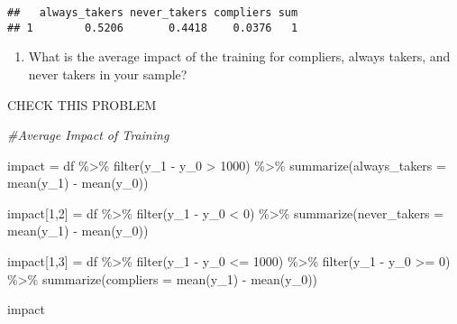 \documentclass[
]{article}
\newenvironment{Shaded}{\begin{snugshade}}{\end{snugshade}}
\newcommand{\AttributeTok}[1]{\textcolor[rgb]{0.77,0.63,0.00}{#1}}
\newcommand{\CommentTok}[1]{\textcolor[rgb]{0.56,0.35,0.01}{\textit{#1}}}
\newcommand{\DecValTok}[1]{\textcolor[rgb]{0.00,0.00,0.81}{#1}}
\newcommand{\FunctionTok}[1]{\textcolor[rgb]{0.00,0.00,0.00}{#1}}
\newcommand{\NormalTok}[1]{#1}
\newcommand{\OtherTok}[1]{\textcolor[rgb]{0.56,0.35,0.01}{#1}}
\newcommand{\SpecialCharTok}[1]{\textcolor[rgb]{0.00,0.00,0.00}{#1}}
\providecommand{\tightlist}{%
  \setlength{\itemsep}{0pt}\setlength{\parskip}{0pt}}
\begin{document}
\begin{verbatim}
##   always_takers never_takers compliers sum
## 1        0.5206       0.4418    0.0376   1
\end{verbatim}

\begin{enumerate}
\def\labelenumi{\arabic{enumi}.}
\setcounter{enumi}{2}
\tightlist
\item
  What is the average impact of the training for compliers, always
  takers, and never takers in your sample?
\end{enumerate}

CHECK THIS PROBLEM

\begin{Shaded}
\begin{Highlighting}[]
\CommentTok{\#Average Impact of Training}

\NormalTok{impact }\OtherTok{=}\NormalTok{ df }\SpecialCharTok{\%\textgreater{}\%}
  \FunctionTok{filter}\NormalTok{(y\_1 }\SpecialCharTok{{-}}\NormalTok{ y\_0 }\SpecialCharTok{\textgreater{}} \DecValTok{1000}\NormalTok{) }\SpecialCharTok{\%\textgreater{}\%}
  \FunctionTok{summarize}\NormalTok{(}\AttributeTok{always\_takers =} \FunctionTok{mean}\NormalTok{(y\_1) }\SpecialCharTok{{-}} \FunctionTok{mean}\NormalTok{(y\_0))}

\NormalTok{impact[}\DecValTok{1}\NormalTok{,}\DecValTok{2}\NormalTok{] }\OtherTok{=}\NormalTok{ df }\SpecialCharTok{\%\textgreater{}\%}
  \FunctionTok{filter}\NormalTok{(y\_1 }\SpecialCharTok{{-}}\NormalTok{ y\_0 }\SpecialCharTok{\textless{}} \DecValTok{0}\NormalTok{) }\SpecialCharTok{\%\textgreater{}\%}
  \FunctionTok{summarize}\NormalTok{(}\AttributeTok{never\_takers =} \FunctionTok{mean}\NormalTok{(y\_1) }\SpecialCharTok{{-}} \FunctionTok{mean}\NormalTok{(y\_0))}

\NormalTok{impact[}\DecValTok{1}\NormalTok{,}\DecValTok{3}\NormalTok{] }\OtherTok{=}\NormalTok{ df }\SpecialCharTok{\%\textgreater{}\%}
  \FunctionTok{filter}\NormalTok{(y\_1 }\SpecialCharTok{{-}}\NormalTok{ y\_0 }\SpecialCharTok{\textless{}=} \DecValTok{1000}\NormalTok{) }\SpecialCharTok{\%\textgreater{}\%}
  \FunctionTok{filter}\NormalTok{(y\_1 }\SpecialCharTok{{-}}\NormalTok{ y\_0 }\SpecialCharTok{\textgreater{}=} \DecValTok{0}\NormalTok{) }\SpecialCharTok{\%\textgreater{}\%}
  \FunctionTok{summarize}\NormalTok{(}\AttributeTok{compliers =} \FunctionTok{mean}\NormalTok{(y\_1) }\SpecialCharTok{{-}} \FunctionTok{mean}\NormalTok{(y\_0))}

\NormalTok{impact}
\end{Highlighting}
\end{Shaded}
\end{document}

